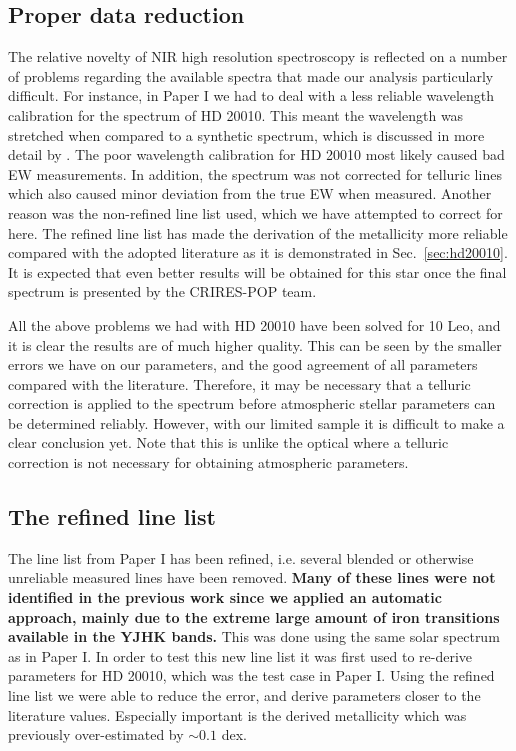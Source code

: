 \documentclass{aa}
\begin{document}
\subsection{Proper data reduction}

The relative novelty of NIR high resolution spectroscopy is reflected on a
number of problems regarding the available spectra that made our analysis
particularly difficult. For instance, in Paper I we had to deal with a less
reliable wavelength calibration for the spectrum of HD 20010. This meant the
wavelength was stretched when compared to a synthetic spectrum, which is
discussed in more detail by \citet{Nicholls2017}. The poor wavelength
calibration for HD 20010 most likely caused bad EW measurements. In addition,
the spectrum was not corrected for telluric lines which also caused minor
deviation from the true EW when measured. Another reason was the non-refined
line list used, which we have attempted to correct for here. The refined line
list has made the derivation of the metallicity more reliable compared with the
adopted literature as it is demonstrated in Sec.~\ref{sec:hd20010}. It is
expected that even better results will be obtained for this star once the final
spectrum is presented by the CRIRES-POP team.

All the above problems we had with HD 20010 have been solved for 10 Leo, and it
is clear the results are of much higher quality. This can be seen by the smaller
errors we have on our parameters, and the good agreement of all parameters
compared with the literature. Therefore, it may be necessary that a telluric
correction is applied to the spectrum before atmospheric stellar parameters can
be determined reliably. However, with our limited sample it is difficult to make
a clear conclusion yet. Note that this is unlike the optical where a telluric
correction is not necessary for obtaining atmospheric parameters.


\subsection{The refined line list}

The line list from Paper I has been refined, i.e. several blended or otherwise unreliable measured
lines have been removed. {\bf Many of these lines were not identified in the previous work since we
applied an automatic approach, mainly due to the extreme large amount of iron transitions available
in the YJHK bands.} This was done using the same solar spectrum as in Paper I. In order to test this
new line list it was first used to re-derive parameters for HD 20010, which was the test case in
Paper I. Using the refined line list we were able to reduce the error, and derive parameters closer
to the literature values. Especially important is the derived metallicity which was previously
over-estimated by $\sim0.1$ dex.
\end{document}
